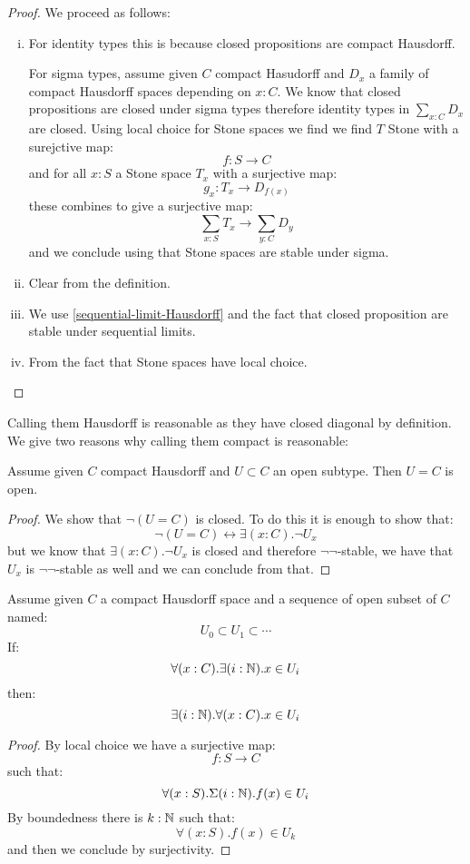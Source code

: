 \begin{proof}
We proceed as follows:
\begin{enumerate}[(i)]
\item For identity types this is because closed propositions are compact Hausdorff.

For sigma types, assume given $C$ compact Hasudorff and $D_x$ a family of compact Hausdorff spaces depending on $x:C$. We know that closed propositions are closed under sigma types therefore identity types in $\sum_{x:C}D_x$ are closed. Using local choice for Stone spaces we find we find $T$ Stone with a surejctive map:
\[f:S\to C\]
and for all $x:S$ a Stone space $T_x$ with a surjective map:
\[g_x:T_x\to D_{f(x)}\]
these combines to give a surjective map:
\[\sum_{x:S}T_x \to \sum_{y:C}D_y\]
and we conclude using that Stone spaces are stable under sigma.

\item Clear from the definition.

\item We use \cref{sequential-limit-Hausdorff} and the fact that closed proposition are stable under sequential limits.

\item From the fact that Stone spaces have local choice.
\end{enumerate}
\end{proof}

Calling them Hausdorff is reasonable as they have closed diagonal by definition. We give two reasons why calling them compact is reasonable:

\begin{lemma}\label{compact-hausdorff-compact}
Assume given $C$ compact Hausdorff and $U\subset C$ an open subtype. Then $U=C$ is open.
\end{lemma}

\begin{proof}
We show that $\neg(U=C)$ is closed. To do this it is enough to show that:
\[\neg(U=C) \leftrightarrow \exists (x:C).\neg U_x\]
but we know that $\exists (x:C).\neg U_x$ is closed and therefore $\neg\neg$-stable, we have that $U_x$ is $\neg\neg$-stable as well and we can conclude from that.
\end{proof}

\begin{lemma}\label{compact-hausforff-countable-cover}
Assume given $C$ a compact Hausdorff space and a sequence of open subset of $C$ named:
\[U_0\subset U_1 \subset \cdots\]
If:
\[\forall(x:C).\exists(i:\mathbb{N}). x\in U_i\]
then:
\[\exists(i:\mathbb{N}). \forall(x:C).x\in U_i\]
\end{lemma}

\begin{proof}
By local choice we have a surjective map:
\[ f: S \to C\]
such that:
\[\forall(x:S).\Sigma (i:\mathbb{N}). f(x)\in U_i\]
By boundedness there is $k:\mathbb{N}$ such that:
\[\forall(x:S). f(x)\in U_k\]
and then we conclude by surjectivity.
\end{proof}

